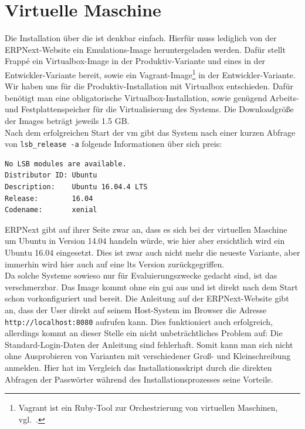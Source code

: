 \section{Virtuelle Maschine}
Die Installation über die  ist denkbar einfach. Hierfür muss lediglich von der ERPNext-Website ein Emulations-Image heruntergeladen werden. Dafür stellt Frappé ein Virtualbox-Image in der Produktiv-Variante und eines in der Entwickler-Variante bereit, sowie ein Vagrant-Image\footnote{Vagrant ist ein Ruby-Tool zur Orchestrierung von virtuellen Maschinen, vgl.\ \cite{Vagrant}.} in der Entwickler-Variante.\\
Wir haben uns für die Produktiv-Installation mit Virtualbox entschieden.
Dafür benötigt man eine obligatorische Virtualbox-Installation, sowie genügend Arbeits- und Festplattenspeicher für die Virtualisierung des Systems. Die Downloadgröße der Images beträgt jeweils 1.5 GB.\\ Nach dem erfolgreichen Start der \gls{vm} gibt das System nach einer kurzen Abfrage von \texttt{lsb\_release -a} folgende Informationen über sich preis:
\begin{verbatim}
No LSB modules are available.
Distributor ID: Ubuntu
Description:    Ubuntu 16.04.4 LTS
Release:        16.04
Codename:       xenial
\end{verbatim}
ERPNext gibt auf ihrer Seite zwar an, dass es sich bei der virtuellen Maschine um Ubuntu in Version 14.04 handeln würde, wie hier aber ersichtlich wird ein Ubuntu 16.04 eingesetzt. Dies ist zwar auch nicht mehr die neueste Variante, aber immerhin wird hier auch auf eine \gls{lts} Version zurückgegriffen.\\
Da solche Systeme sowieso nur für Evaluierungszwecke gedacht sind, ist das verschmerzbar.
Das Image kommt ohne ein \gls{gui} aus und ist direkt nach dem Start schon vorkonfiguriert und bereit. Die Anleitung auf der ERPNext-Website gibt an, dass der User direkt auf seinem Host-System im Browser die Adresse \texttt{http://localhost:8080} aufrufen kann. Dies funktioniert auch erfolgreich, allerdings kommt an dieser Stelle ein nicht unbeträchtliches Problem auf: Die Standard-Login-Daten der Anleitung sind fehlerhaft. Somit kann man sich nicht ohne Ausprobieren von Varianten mit verschiedener Groß- und Kleinschreibung anmelden. Hier hat im Vergleich das Installationsskript durch die direkten Abfragen der Passwörter während des Installationsprozesses seine Vorteile.

